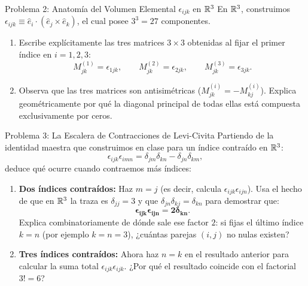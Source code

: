 \documentclass[11pt,letterpaper]{article}
\begin{document}
\begin{infobox}{Problema 2: Anatomía del Volumen Elemental $\epsilon_{ijk}$ en $\mathbb{R}^3$}
En $\mathbb{R}^3$, construimos $\epsilon_{ijk} \equiv \hat{e}_i \cdot (\hat{e}_j \times \hat{e}_k)$, el cual posee $3^3 = 27$ componentes.
\begin{enumerate}[label=(\alph*)]
    \item Escribe explícitamente las tres matrices $3 \times 3$ obtenidas al fijar el primer índice en $i = 1, 2, 3$:
    \[
    M^{(1)}_{jk} = \epsilon_{1jk}, \qquad M^{(2)}_{jk} = \epsilon_{2jk}, \qquad M^{(3)}_{jk} = \epsilon_{3jk}.
    \]
    \item Observa que las tres matrices son antisimétricas ($M^{(i)}_{jk} = -M^{(i)}_{kj}$). Explica geométricamente por qué la diagonal principal de todas ellas está compuesta exclusivamente por ceros.
\end{enumerate}
\end{infobox}


\begin{infobox}{Problema 3: La Escalera de Contracciones de Levi-Civita}
Partiendo de la identidad maestra que construimos en clase para un índice contraído en $\mathbb{R}^3$:
\[
\epsilon_{ijk}\epsilon_{imn} = \delta_{jm}\delta_{kn} - \delta_{jn}\delta_{km},
\]
deduce qué ocurre cuando contraemos más índices:
\begin{enumerate}[label=(\alph*)]
    \item \textbf{Dos índices contraídos:} Haz $m = j$ (es decir, calcula $\epsilon_{ijk}\epsilon_{ijn}$). Usa el hecho de que en $\mathbb{R}^3$ la traza es $\delta_{jj} = 3$ y que $\delta_{jn}\delta_{kj} = \delta_{kn}$ para demostrar que:
    \[
    \mathbf{\epsilon_{ijk}\epsilon_{ijn} = 2\delta_{kn}}.
    \]
    Explica combinatoriamente de dónde sale ese factor $2$: si fijas el último índice $k=n$ (por ejemplo $k=n=3$), ¿cuántas parejas $(i,j)$ no nulas existen?
    \item \textbf{Tres índices contraídos:} Ahora haz $n = k$ en el resultado anterior para calcular la suma total $\epsilon_{ijk}\epsilon_{ijk}$. ¿Por qué el resultado coincide con el factorial $3! = 6$?
\end{enumerate}
\end{infobox}
\end{document}
